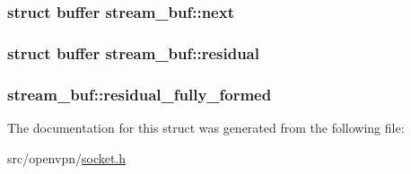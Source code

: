 \subsubsection[{next}]{\setlength{\rightskip}{0pt plus 5cm}struct {\bf buffer} stream\+\_\+buf\+::next}\label{structstream__buf_a9ffcabf271af0767607d3282493109f4}
\hypertarget{structstream__buf_a4b9282d70e2db74ec58403a72b40d8fd}{}
\subsubsection[{residual}]{\setlength{\rightskip}{0pt plus 5cm}struct {\bf buffer} stream\+\_\+buf\+::residual}\label{structstream__buf_a4b9282d70e2db74ec58403a72b40d8fd}
\hypertarget{structstream__buf_a592d8c48a600ddfaf113fc455f5db033}{}
\subsubsection[{residual\+\_\+fully\+\_\+formed}]{ stream\+\_\+buf\+::residual\+\_\+fully\+\_\+formed}\label{structstream__buf_a592d8c48a600ddfaf113fc455f5db033}


The documentation for this struct was generated from the following file\+:\begin{DoxyCompactItemize}
\item 
src/openvpn/\hyperlink{socket_8h}{socket.\+h}\end{DoxyCompactItemize}
